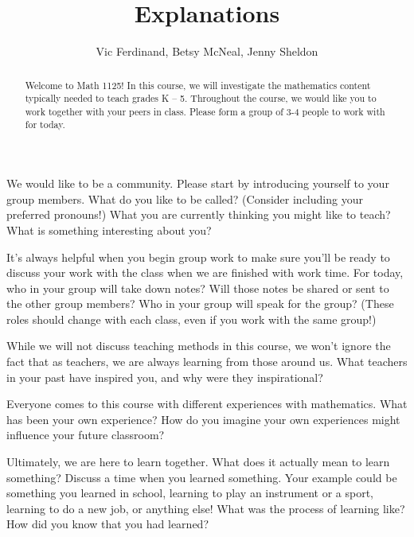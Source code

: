 \documentclass[noauthor,nooutcomes, handout]{ximera}
\title{Explanations}
\author{Vic Ferdinand, Betsy McNeal, Jenny Sheldon}
\begin{document}
\begin{abstract} 
Welcome to Math 1125! In this course, we will investigate the mathematics content typically needed to teach grades K -- 5. Throughout the course, we would like you to work together with your peers in class. Please form a group of 3-4 people to work with for today.
\end{abstract}
\maketitle



\begin{question}
We would like to be a community. Please start by introducing yourself to your group members. What do you like to be called? (Consider including your preferred pronouns!) What you are currently thinking you might like to teach? What is something interesting about you?
\end{question}


\begin{question}
It's always helpful when you begin group work to make sure you'll be ready to discuss your work with the class when we are finished with work time. For today, who in your group will take down notes? Will those notes be shared or sent to the other group members? Who in your group will speak for the group? (These roles should change with each class, even if you work with the same group!)
\end{question}


\begin{question}
While we will not discuss teaching methods in this course, we won't ignore the fact that as teachers, we are always learning from those around us. What teachers in your past have inspired you, and why were they inspirational?
\end{question}


\begin{question}
Everyone comes to this course with different experiences with mathematics. What has been your own experience? How do you imagine your own experiences might influence your future classroom?
\end{question}


\begin{question}
Ultimately, we are here to learn together. What does it actually mean to learn something? Discuss a time when you learned something. Your example could be something you learned in school, learning to play an instrument or a sport, learning to do a new job, or anything else! What was the process of learning like? How did you know that you had learned?
\end{question}
\end{document}

